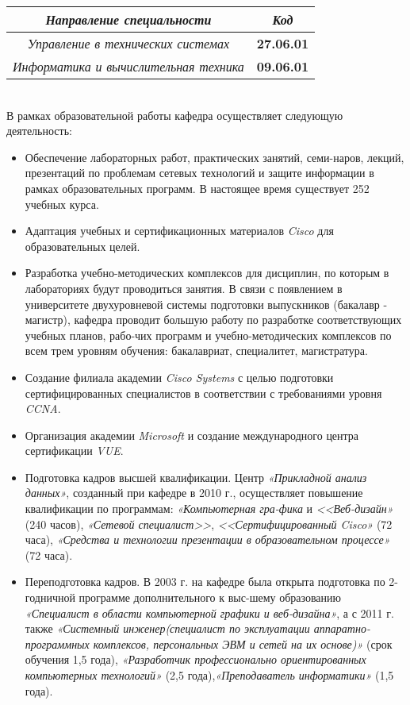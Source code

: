 \documentclass[12pt,a4paper]{article}
\begin{document}
\begin{flushleft}
\begin{flushleft}
\begin{tabular}{|| c || c ||}
\hline
\emph{Направление специальности} & \emph{Код} \\ \hline
\textit{Управление в технических системах} & \textbf{27.06.01} \\
\textit{Информатика и вычислительная техника} & \textbf{09.06.01}\\
\hline
\end{tabular}
\\
В рамках образовательной работы кафедра осуществляет следующую деятельность:
\\
\begin{itemize}
\item Обеспечение лабораторных работ, практических занятий, семи-наров, лекций, презентаций по проблемам сетевых технологий и защите информации в рамках образовательных программ. В настоящее время существует 252 учебных курса.
\item Адаптация учебных и сертификационных материалов \textit{Cisco} для образовательных целей.
\item Разработка учебно-методических комплексов для дисциплин, по которым в лабораториях будут проводиться занятия. В связи с появлением в университете двухуровневой системы подготовки выпускников (бакалавр - магистр), кафедра проводит большую работу по разработке соответствующих учебных планов, рабо-чих программ и учебно-методических комплексов по всем трем уровням обучения: бакалавриат, специалитет, магистратура.
\item Создание филиала академии \textit{Cisco Systems} с целью подготовки сертифицированных специалистов в соответствии с требованиями уровня \textit{CCNA}.
\item Организация академии \textit{Microsoft} и создание международного центра сертификации \textit{VUE}.
\item Подготовка кадров высшей квалификации. Центр \textit{«Прикладной анализ данных»}, созданный при кафедре в 2010 г., осуществляет повышение квалификации по программам: \textit{«Компьютерная гра-фика} и \textit{<<Веб-дизайн»} (240 часов), \textit{«Сетевой специалист>>}, \textit{<<Сертифицированный Cisco»} (72 часа), \textit{«Средства и технологии презентации в образовательном процессе»} (72 часа).
\item Переподготовка кадров. В 2003 г. на кафедре была открыта подготовка по 2-годничной программе дополнительного к выс-шему образованию \textit{«Специалист в области компьютерной графики и веб-дизайна»}, а с 2011 г. также \textit{«Системный инженер(специалист по эксплуатации аппаратно-программных комплексов, персональных ЭВМ и сетей на их основе)»} (срок обучения 1,5 года), \textit{«Разработчик профессионально ориентированных компьютерных технологий»} (2,5 года),\textit{«Преподаватель информатики»}  (1,5 года).
\end{itemize}
\end{flushleft}

\end{flushleft}
\end{document}
